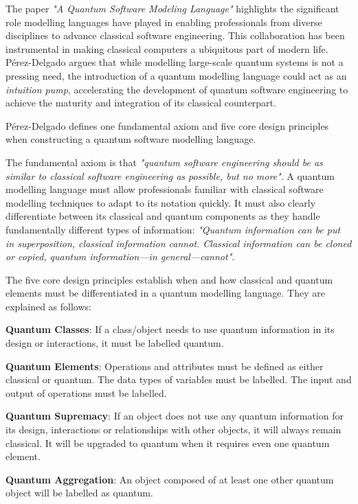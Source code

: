 \documentclass{article}
\begin{document}
{The paper \textit{"A Quantum Software Modeling Language"} highlights the significant role modelling languages have played in enabling professionals from diverse disciplines to advance classical software engineering. This collaboration has been instrumental in making classical computers a ubiquitous part of modern life. Pérez-Delgado argues that while modelling large-scale quantum systems is not a pressing need, the introduction of a quantum modelling language could act as an \textit{intuition pump}, accelerating the development of quantum software engineering to achieve the maturity and integration of its classical counterpart\cite{Pérez-Delgado2022}.

Pérez-Delgado defines one fundamental axiom and five core design principles when constructing a quantum software modelling language. 

The fundamental axiom is that \textit{"quantum software
engineering should be as similar to classical software engineering as possible, but no more"}\cite{Pérez-Delgado2022}. A quantum modelling language must allow professionals familiar with classical software modelling techniques to adapt to its notation quickly. It must also clearly differentiate between its classical and quantum components as they handle fundamentally different types of information: \textit{"Quantum information can be put in superposition, classical information
cannot. Classical information can be cloned or copied, quantum information—in
general—cannot"}\cite{Pérez-Delgado2022}.

The five core design principles establish when and how classical and quantum elements must be differentiated in a quantum modelling language. They are explained as follows: 

\textbf{Quantum Classes}: If a class/object needs to use quantum information in its design or interactions, it must be labelled quantum.

\textbf{Quantum Elements}: Operations and attributes must be defined as either classical or quantum. The data types of variables must be labelled. The input and output of operations must be labelled. 

\textbf{Quantum Supremacy}: If an object does not use any quantum information for its design, interactions or relationships with other objects, it will always remain classical. It will be upgraded to quantum when it requires even one quantum element. 

\textbf{Quantum Aggregation}: An object composed of at least one other quantum object will be labelled as quantum.

}
\end{document}
